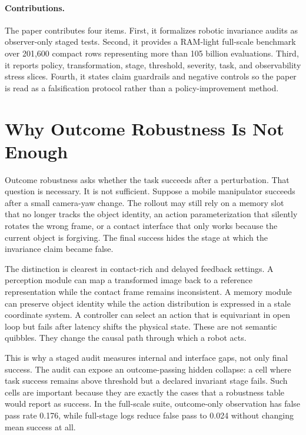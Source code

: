 \documentclass{article}
\begin{document}
\paragraph{Contributions.}
The paper contributes four items. First, it formalizes robotic invariance audits as observer-only staged tests. Second, it provides a RAM-light full-scale benchmark over 201,600 compact rows representing more than 105 billion evaluations. Third, it reports policy, transformation, stage, threshold, severity, task, and observability stress slices. Fourth, it states claim guardrails and negative controls so the paper is read as a falsification protocol rather than a policy-improvement method.

\section{Why Outcome Robustness Is Not Enough}

Outcome robustness asks whether the task succeeds after a perturbation. That question is necessary. It is not sufficient. Suppose a mobile manipulator succeeds after a small camera-yaw change. The rollout may still rely on a memory slot that no longer tracks the object identity, an action parameterization that silently rotates the wrong frame, or a contact interface that only works because the current object is forgiving. The final success hides the stage at which the invariance claim became false.

The distinction is clearest in contact-rich and delayed feedback settings. A perception module can map a transformed image back to a reference representation while the contact frame remains inconsistent. A memory module can preserve object identity while the action distribution is expressed in a stale coordinate system. A controller can select an action that is equivariant in open loop but fails after latency shifts the physical state. These are not semantic quibbles. They change the causal path through which a robot acts.

This is why a staged audit measures internal and interface gaps, not only final success. The audit can expose an outcome-passing hidden collapse: a cell where task success remains above threshold but a declared invariant stage fails. Such cells are important because they are exactly the cases that a robustness table would report as success. In the full-scale suite, outcome-only observation has false pass rate 0.176, while full-stage logs reduce false pass to 0.024 without changing mean success at all.
\end{document}
